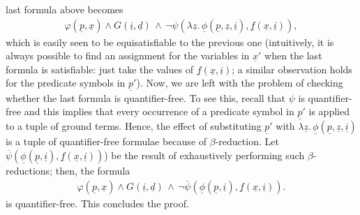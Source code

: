 \documentclass[conference]{IEEEtran}
\begin{document}
\begin{LONG}
\begin{IEEEproof}
  last formula above becomes
  \begin{eqnarray*}
    \varphi(\underline{p},\underline{x}) \wedge
    G(\underline{i}, \underline{d}) \,\wedge\,
    \neg \psi(\lambda \underline{z}.\,\underline{\phi}(\underline{p},\underline{z},\underline{i}),\underline{f}(\underline{x}, \underline{i})) ,
  \end{eqnarray*}
  which is easily seen to be equisatisfiable to the previous one
  (intuitively, it is always possible to find an assignment for the
  variables in $\underline{x}'$ when the last formula is satisfiable:
  just take the values of $\underline{f}(\underline{x},
  \underline{i})$; a similar observation holds for the predicate
  symbols in $\underline{p}'$).  Now, we are left with the problem of
  checking whether the last formula is quantifier-free.  To see this,
  recall that $\psi$ is quantifier-free and this implies that every
  occurrence of a predicate symbol in $\underline{p}'$ is applied to a
  tuple of ground terms.  Hence, the effect of substituting
  $\underline{p}'$ with $\lambda
  \underline{z}.\, \underline{\phi}(\underline{p},\underline{z},\underline{i})$
  is a tuple of quantifier-free formulae because of $\beta$-reduction.
  Let
  $\overline{\psi}(\underline{\phi}(\underline{p},\underline{i}),\underline{f}(\underline{x},
  \underline{i}))$) be the result of exhaustively performing such
  $\beta$-reductions; then, the formula
  \begin{eqnarray*}
    \label{eq:qf-vc}
    \varphi(\underline{p},\underline{x}) \wedge
    G(\underline{i}, \underline{d}) \,\wedge\,
    \neg \overline{\psi}(\underline{\phi}(\underline{p},\underline{i}),\underline{f}(\underline{x}, \underline{i})) . 
  \end{eqnarray*}
  is quantifier-free.  This concludes the proof. 
\end{IEEEproof}


\end{LONG}
\end{document}
